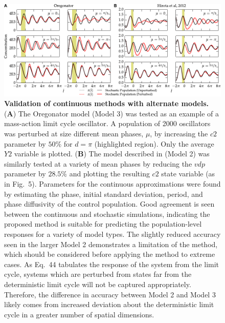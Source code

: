 \documentclass[11pt, letterpaper]{article}
\begin{document}
\begin{figure}[h!]
  \begin{center}
    \includegraphics[width=\textwidth]{figures/figure_S3.pdf}
    \caption{
{\bfseries Validation of continuous methods with alternate models.}
({\bfseries A}) The Oregonator model (Model 3) was tested as an example of a mass-action limit cycle oscillator.
A population of 2000 oscillators was perturbed at size different mean phases, $\mu$, by increasing the $\mathit{c2}$ parameter by $50\%$ for $d=\pi$ (highlighted region).
Only the average $\mathit{Y2}$ variable is plotted.
({\bfseries B}) The model described in \cite{Hirota2012} (Model 2) was similarly tested at a variety of mean phases by reducing the $\mathit{vdp}$ parameter by $28.5\%$ and plotting the resulting $\mathit{c2}$ state variable (as in Fig.~5).
Parameters for the continuous approximations were found by estimating the phase, initial standard deviation, period, and phase diffusivity of the control population.
Good agreement is seen between the continuous and stochastic simulations, indicating the proposed method is suitable for predicting the population-level responses for a variety of model types.
The slightly reduced accuracy seen in the larger Model 2 demonstrates a limitation of the method, which should be considered before applying the method to extreme cases.
As Eq.~44 tabulates the response of the system from the limit cycle, systems which are perturbed from states far from the deterministic limit cycle will not be captured appropriately.
Therefore, the difference in accuracy between Model 2 and Model 3 likely comes from increased deviation about the deterministic limit cycle in a greater number of spatial dimensions.
}
\end{center}
\end{figure}
\end{document}
